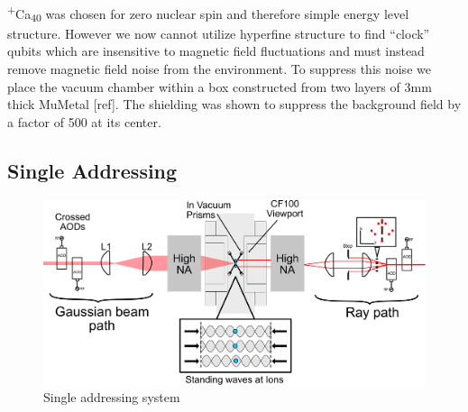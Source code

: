 \documentclass[12pt]{iopart}
\begin{document}
\textsuperscript{+}Ca\textsubscript{40} was chosen for zero nuclear
spin and therefore simple energy level structure. However we now
cannot utilize hyperfine structure to find ``clock'' qubits which are
insensitive to magnetic field fluctuations and must instead remove
magnetic field noise from the environment. To suppress this noise 
we place the vacuum chamber within a box constructed from two layers
of 3mm thick MuMetal [ref]. The shielding was shown to suppress the
background field by a factor of 500 at its center.

\subsection{Single Addressing}

\begin{figure}
  \begin{center}
   \noindent\includegraphics[width=\linewidth]{figures/vac_can_AOD_small.pdf}
  \end{center}
  \caption{Single addressing system}
  \label{fig:can}
\end{figure}
\end{document}
